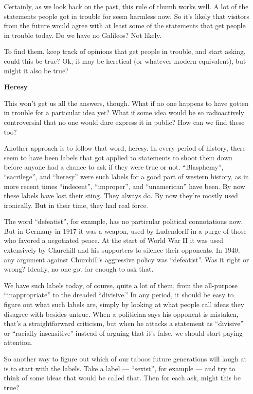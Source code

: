 Certainly, as we look back on the past, this rule of thumb works well. A
lot of the statements people got in trouble for seem harmless now. So
it's likely that visitors from the future would agree with at least some
of the statements that get people in trouble today. Do we have no
Galileos? Not likely.

To find them, keep track of opinions that get people in trouble, and
start asking, could this be true? Ok, it may be heretical (or whatever
modern equivalent), but might it also be true?

\textbf{Heresy}

This won't get us all the answers, though. What if no one happens to
have gotten in trouble for a particular idea yet? What if some idea
would be so radioactively controversial that no one would dare express
it in public? How can we find these too?

Another approach is to follow that word, heresy. In every period of
history, there seem to have been labels that got applied to statements
to shoot them down before anyone had a chance to ask if they were true
or not. ``Blasphemy'', ``sacrilege'', and ``heresy'' were such labels
for a good part of western history, as in more recent times
``indecent'', ``improper'', and ``unamerican'' have been. By now these
labels have lost their sting. They always do. By now they're mostly used
ironically. But in their time, they had real force.

The word ``defeatist'', for example, has no particular political
connotations now. But in Germany in 1917 it was a weapon, used by
Ludendorff in a purge of those who favored a negotiated peace. At the
start of World War II it was used extensively by Churchill and his
supporters to silence their opponents. In 1940, any argument against
Churchill's aggressive policy was ``defeatist''. Was it right or wrong?
Ideally, no one got far enough to ask that.

We have such labels today, of course, quite a lot of them, from the
all-purpose ``inappropriate'' to the dreaded ``divisive.'' In any
period, it should be easy to figure out what such labels are, simply by
looking at what people call ideas they disagree with besides untrue.
When a politician says his opponent is mistaken, that's a
straightforward criticism, but when he attacks a statement as
``divisive'' or ``racially insensitive'' instead of arguing that it's
false, we should start paying attention.

So another way to figure out which of our taboos future generations will
laugh at is to start with the labels. Take a label --- ``sexist'', for
example --- and try to think of some ideas that would be called that.
Then for each ask, might this be true?

